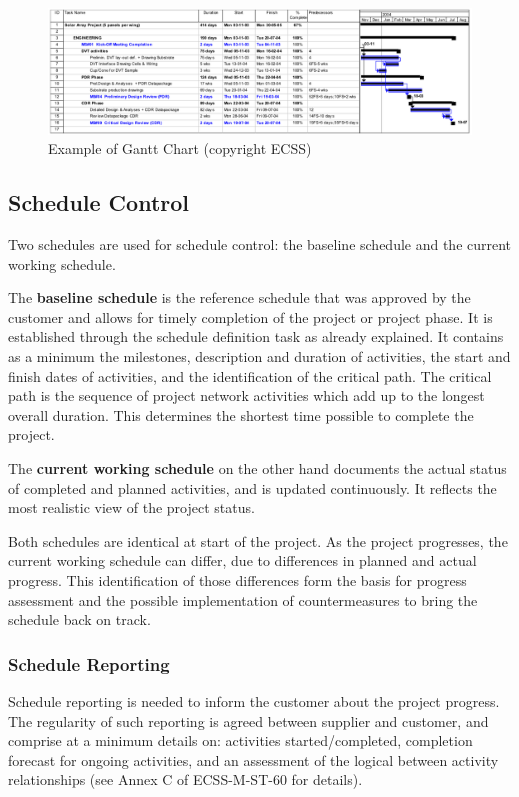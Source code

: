 \begin{figure}[h]
\centering\includegraphics[scale=0.3]{fig/example_of_gantt_chart}
\caption{Example of Gantt Chart (copyright ECSS)}
\label{fig:Example of Gantt Chart}
\end{figure}

\subsection{Schedule Control}

Two schedules are used for schedule control: the baseline schedule and the current working schedule. 

The \textbf{baseline schedule} is the reference schedule that was approved by the customer and allows for timely completion of the project or project phase. It is established through the schedule definition task as already explained. It contains as a minimum the milestones, description and duration of activities, the start and finish dates of activities, and the identification of the critical path. The critical path is the sequence of project network activities which add up to the longest overall duration. This determines the shortest time possible to complete the project.

The \textbf{current working schedule} on the other hand documents the actual status of completed and planned activities, and is updated continuously. It reflects the most realistic view of the project status.

Both schedules are identical at start of the project. As the project progresses, the current working schedule can differ, due to differences in planned and actual progress. This identification of those differences form the basis for progress assessment and the possible implementation of countermeasures to bring the schedule back on track.

\subsubsection{Schedule Reporting}

Schedule reporting is needed to inform the customer about the project progress. The regularity of such reporting is agreed between supplier and customer, and comprise at a minimum details on: activities started/completed, completion forecast for ongoing activities, and an assessment of the logical between activity relationships (see Annex C of ECSS-M-ST-60 for details).

